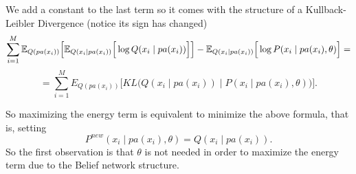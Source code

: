 We add a constant to the last term so it comes with the structure of a Kullback-Leibler Divergence (notice its sign has changed)
\[
  \sum_{i = 1}^{M}\mathbb{E}_{Q(pa(x_{i}))}\Big[\mathbb{E}_{Q(x_{i}\mid pa(x_{i}))}\Big[\log{Q(x_{i} \mid pa(x_{i}))}\Big]\Big] - \mathbb{E}_{Q(x_{i}\mid pa(x_{i}))}\Big[\log{P(x_{i} \mid pa(x_{i}), \theta)}\Big]=
\]
\[
  = \sum_{i = 1}^{M} E_{Q(pa(x_{i}))} \Big[KL \Big( Q(x_{i}\mid pa(x_{i})) \mid P(x_{i} \mid pa(x_{i}), \theta) \Big) \Big].
\]

So maximizing the energy term is equivalent to minimize the above formula, that is, setting
\[
  P^{new}(x_{i} \mid pa(x_{i}), \theta) = Q(x_{i} \mid pa(x_{i})).
\]
So the first observation is that \(\theta\) is not needed in order to maximize the energy term due to the Belief network structure.
